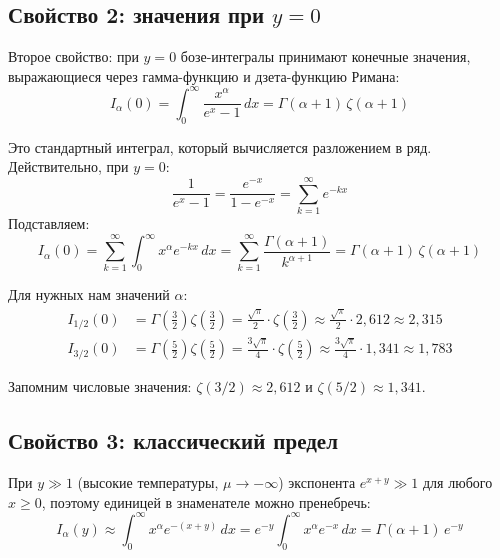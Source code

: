 \documentclass[../general/general]{subfiles}
\begin{document}
\subsection{Свойство 2: значения при $y = 0$}

Второе свойство: при $y = 0$ бозе-интегралы принимают конечные значения, выражающиеся через гамма-функцию и дзета-функцию Римана:
\begin{equation}
    I_\alpha(0) = \int_0^\infty \frac{x^\alpha}{e^x - 1}\, dx = \Gamma(\alpha+1)\,\zeta(\alpha+1)
\end{equation}

Это стандартный интеграл, который вычисляется разложением в ряд. Действительно, при $y = 0$:
\begin{equation}
    \frac{1}{e^x - 1} = \frac{e^{-x}}{1 - e^{-x}} = \sum_{k=1}^\infty e^{-kx}
\end{equation}
Подставляем:
\begin{equation}
    I_\alpha(0) = \sum_{k=1}^\infty \int_0^\infty x^\alpha e^{-kx}\, dx = \sum_{k=1}^\infty \frac{\Gamma(\alpha+1)}{k^{\alpha+1}} = \Gamma(\alpha+1)\,\zeta(\alpha+1)
\end{equation}

Для нужных нам значений $\alpha$:
\begin{align}
    I_{1/2}(0) &= \Gamma\!\left(\tfrac{3}{2}\right)\zeta\!\left(\tfrac{3}{2}\right) = \frac{\sqrt{\pi}}{2}\cdot\zeta\!\left(\tfrac{3}{2}\right) \approx \frac{\sqrt{\pi}}{2}\cdot 2{,}612 \approx 2{,}315 \\[4pt]
    I_{3/2}(0) &= \Gamma\!\left(\tfrac{5}{2}\right)\zeta\!\left(\tfrac{5}{2}\right) = \frac{3\sqrt{\pi}}{4}\cdot\zeta\!\left(\tfrac{5}{2}\right) \approx \frac{3\sqrt{\pi}}{4}\cdot 1{,}341 \approx 1{,}783
\end{align}

Запомним числовые значения: $\zeta(3/2) \approx 2{,}612$ и $\zeta(5/2) \approx 1{,}341$.

\subsection{Свойство 3: классический предел}

При $y \gg 1$ (высокие температуры, $\mu \to -\infty$) экспонента $e^{x+y} \gg 1$ для любого $x \geq 0$, поэтому единицей в знаменателе можно пренебречь:
\begin{equation}
    I_\alpha(y) \approx \int_0^\infty x^\alpha e^{-(x+y)}\, dx = e^{-y}\int_0^\infty x^\alpha e^{-x}\, dx = \Gamma(\alpha+1)\,e^{-y}
\end{equation}
\end{document}
